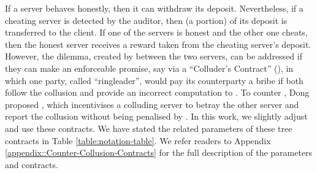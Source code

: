 If a server behaves honestly, then it can withdraw its deposit. Nevertheless, if a cheating server is detected by the auditor, then (a portion) of its deposit is transferred to the client. If one of the servers is honest and the other one cheats, then the honest server receives a reward taken from the cheating server's deposit. However, the dilemma, created by \SCpc between the two servers, can be addressed if they can make an enforceable promise, say via a ``Colluder's Contract'' (\SCcc),  in which one party, called ``ringleader'', would pay its counterparty a bribe if both follow the collusion and provide an incorrect computation to \SCpc. To counter \SCcc, Dong   \et proposed \SCtc, which incentivises a colluding server to betray the other server and report the collusion without being penalised by \SCpc. In this work, we slightly adjust and use these contracts. We have stated the related parameters of these tree contracts in Table \ref{table:notation-table}. We refer readers to Appendix \ref{appendix::Counter-Collusion-Contracts} for the full description of the parameters and contracts. 




%

